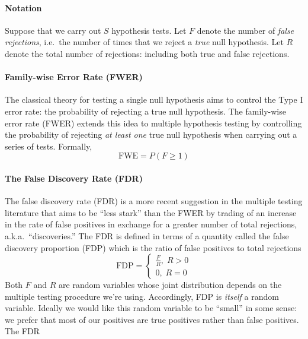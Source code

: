 
\paragraph{Notation} 
Suppose that we carry out $S$ hypothesis tests.
Let $F$ denote the number of \emph{false rejections}, i.e.\ the number of times that we reject a \emph{true} null hypothesis.
Let $R$ denote the total number of rejections: including both true and false rejections.

\paragraph{Family-wise Error Rate (FWER)}
The classical theory for testing a single null hypothesis aims to control the Type I error rate: the probability of rejecting a true null hypothesis.
The family-wise error rate (FWER) extends this idea to multiple hypothesis testing by controlling the probability of rejecting \emph{at least one} true null hypothesis when carrying out a series of tests.
Formally,
\begin{equation*}
  \mbox{FWE} = P(F\geq 1)
\end{equation*}

\paragraph{The False Discovery Rate (FDR)}
The false discovery rate (FDR) is a more recent suggestion in the multiple testing literature that aims to be ``less stark'' than the FWER by trading of an increase in the rate of false positives in exchange for a greater number of total rejections, a.k.a.\ ``discoveries.''
The FDR is defined in terms of a quantity called the false discovery proportion (FDP) which is the ratio of false positives to total rejections
\begin{equation*}
  \mbox{FDP} = \left\{ \begin{array}{c}
    \displaystyle\frac{F}{R}, \; R > 0 \\
    0, \; R = 0
  \end{array}\right.
\end{equation*}
Both $F$ and $R$ are random variables whose joint distribution depends on the multiple testing procedure we're using.
Accordingly, FDP is \emph{itself} a random variable.
Ideally we would like this random variable to be ``small'' in some sense: we prefer that most of our positives are true positives rather than false positives.
The FDR 

